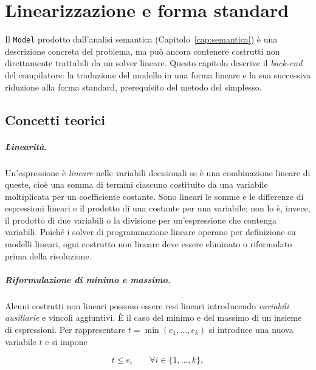 
\chapter{Linearizzazione e forma standard}
\label{cap:linearizzazione}

Il \texttt{Model} prodotto dall'analisi semantica (Capitolo~\ref{cap:semantica})
è una descrizione concreta del problema, ma può ancora contenere costrutti non
direttamente trattabili da un solver lineare. Questo capitolo descrive il
\emph{back-end} del compilatore: la traduzione del modello in una forma lineare
e la sua successiva riduzione alla forma standard, prerequisito del metodo del
simplesso.

\section{Concetti teorici}
\label{sec:linearizzazione-teoria}

\paragraph{Linearità.}
Un'espressione è \emph{lineare} nelle variabili decisionali se è una
combinazione lineare di queste, cioè una somma di termini ciascuno costituito da
una variabile moltiplicata per un coefficiente costante. Sono lineari le somme e
le differenze di espressioni lineari e il prodotto di una costante per una
variabile; non lo è, invece, il prodotto di due variabili o la divisione per
un'espressione che contenga variabili. Poiché i solver di programmazione lineare
operano per definizione su modelli lineari, ogni costrutto non lineare deve
essere eliminato o riformulato prima della risoluzione.

\paragraph{Riformulazione di minimo e massimo.}
Alcuni costrutti non lineari possono essere resi lineari introducendo
\emph{variabili ausiliarie} e vincoli aggiuntivi. È il caso del minimo e del
massimo di un insieme di espressioni. Per rappresentare $t = \min(e_1, \dots,
e_k)$ si introduce una nuova variabile $t$ e si impone

\begin{equation}
\label{eq:min-lin}
t \le e_i \qquad \forall i \in \{1, \dots, k\},
\end{equation}

